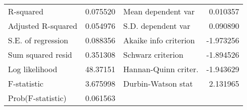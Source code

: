 \begin{tabular}{lrrrr}
\midrule
\multicolumn{1}{l}{R-squared}&\multicolumn{1}{r}{0.075520}&\multicolumn{2}{l}{Mean dependent var}&\multicolumn{1}{r}{0.010357}\\
\multicolumn{1}{l}{Adjusted R-squared}&\multicolumn{1}{r}{0.054976}&\multicolumn{2}{l}{S.D. dependent var}&\multicolumn{1}{r}{0.090890}\\
\multicolumn{1}{l}{S.E. of regression}&\multicolumn{1}{r}{0.088356}&\multicolumn{2}{l}{Akaike info criterion}&\multicolumn{1}{r}{-1.973256}\\
\multicolumn{1}{l}{Sum squared resid}&\multicolumn{1}{r}{0.351308}&\multicolumn{2}{l}{Schwarz criterion}&\multicolumn{1}{r}{-1.894526}\\
\multicolumn{1}{l}{Log likelihood}&\multicolumn{1}{r}{48.37151}&\multicolumn{2}{l}{Hannan-Quinn criter.}&\multicolumn{1}{r}{-1.943629}\\
\multicolumn{1}{l}{F-statistic}&\multicolumn{1}{r}{3.675998}&\multicolumn{2}{l}{Durbin-Watson stat}&\multicolumn{1}{r}{2.131965}\\
\multicolumn{1}{l}{Prob(F-statistic)}&\multicolumn{1}{r}{0.061563}&\multicolumn{1}{c}{}&\multicolumn{1}{c}{}&\multicolumn{1}{c}{}\\
\bottomrule
\end{tabular}
